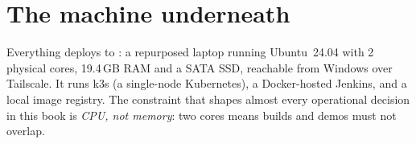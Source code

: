 \section*{The machine underneath}

Everything deploys to : a repurposed laptop running
Ubuntu~24.04 with 2 physical cores, 19.4\,GB RAM and a SATA SSD, reachable
from Windows over Tailscale. It runs k3s (a single-node Kubernetes),
a Docker-hosted Jenkins, and a local image registry. The constraint that
shapes almost every operational decision in this book is \emph{CPU, not
memory}: two cores means builds and demos must not overlap.
